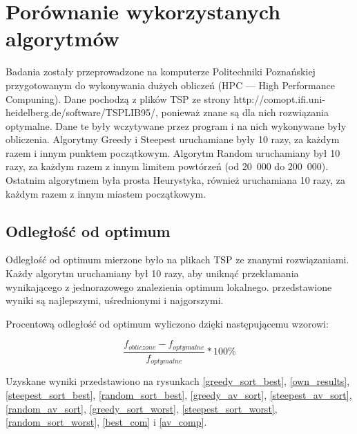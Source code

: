 \section{Porównanie wykorzystanych algorytmów}

Badania zostały przeprowadzone na komputerze Politechniki Poznańskiej przygotowanym do 
wykonywania dużych obliczeń (HPC --- High Performance Compuning). Dane pochodzą z plików
TSP ze strony http://comopt.ifi.uni-heidelberg.de/software/TSPLIB95/, ponieważ znane są dla
nich rozwiązania optymalne. Dane te były wczytywane przez program i na nich wykonywane były 
obliczenia. Algorytmy Greedy i Steepest uruchamiane były 10 razy, za każdym razem i innym 
punktem początkowym. Algorytm Random uruchamiany był 10 razy, za każdym razem z innym 
limitem powtórzeń (od 20~000 do 200~000). Ostatnim algorytmem była prosta Heurystyka, również uruchamiana 10 razy, za każdym razem z innym miastem początkowym.

\subsection{Odległość od optimum}

Odległość od optimum mierzone było na plikach TSP ze znanymi rozwiązaniami. Każdy algorytm 
uruchamiany był 10 razy, aby uniknąć przekłamania wynikającego z jednorazowego znalezienia 
optimum lokalnego. przedstawione wyniki są najlepszymi, uśrednionymi i najgorszymi.

Procentową odległość od optimum wyliczono dzięki następującemu wzorowi:

$$ \frac{f_{obliczone} - f_{optymalne}}{f_{optymalne}} * 100 \% $$


Uzyskane wyniki przedstawiono na rysunkach \ref{greedy_sort_best}, \ref{own_results}, \ref{steepest_sort_best}, 
\ref{random_sort_best}, \ref{greedy_av_sort},  \ref{steepest_av_sort}, 
\ref{random_av_sort}, \ref{greedy_sort_worst},
\ref{steepest_sort_worst}, \ref{random_sort_worst}, \ref{best_com} i \ref{av_comp}. %

